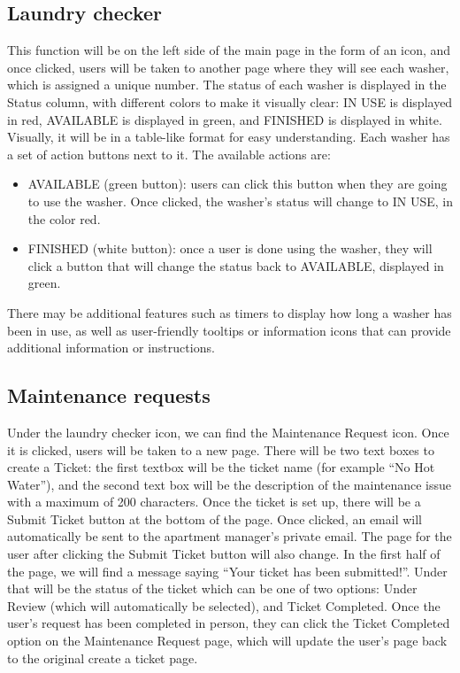 \documentclass[conference]{IEEEtran}
\begin{document}
\subsection{Laundry checker}
This function will be on the left side of the main page in the form of an icon, and once clicked, users will be taken to another page where they will see each washer, which is assigned a unique number. The status of each washer is displayed in the Status column, with different colors to make it visually clear: IN USE is displayed in red, AVAILABLE is displayed in green, and FINISHED is displayed in white. Visually, it will be in a table-like format for easy understanding. Each washer has a set of action buttons next to it. The available actions are:
\begin{itemize}
    \item AVAILABLE (green button): users can click this button when they are going to use the washer. Once clicked, the washer’s status will change to IN USE, in the color red.
    \item FINISHED (white button): once a user is done using the washer, they will click a button that will change the status back to AVAILABLE, displayed in green.
\end{itemize}
There may be additional features such as timers to display how long a washer has been in use, as well as user-friendly tooltips or information icons that can provide additional information or instructions.
\subsection{Maintenance requests}
Under the laundry checker icon, we can find the Maintenance Request icon. Once it is clicked, users will be taken to a new page. There will be two text boxes to create a Ticket: the first textbox will be the ticket name (for example “No Hot Water”), and the second text box will be the description of the maintenance issue with a maximum of 200 characters. Once the ticket is set up, there will be a Submit Ticket button at the bottom of the page. Once clicked, an email will automatically be sent to the apartment manager's private email. The page for the user after clicking the Submit Ticket button will also change. In the first half of the page, we will find a message saying “Your ticket has been submitted!”. Under that will be the status of the ticket which can be one of two options: Under Review (which will automatically be selected), and Ticket Completed. Once the user’s request has been completed in person, they can click the Ticket Completed option on the Maintenance Request page, which will update the user’s page back to the original create a ticket page.
\end{document}
